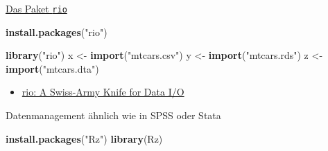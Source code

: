 \documentclass[
  ignorenonframetext,
]{beamer}
\newenvironment{Shaded}{\begin{snugshade}}{\end{snugshade}}
\newcommand{\KeywordTok}[1]{\textcolor[rgb]{0.26,0.66,0.93}{\textbf{#1}}}
\newcommand{\NormalTok}[1]{\textcolor[rgb]{0.74,0.68,0.62}{#1}}
\newcommand{\StringTok}[1]{\textcolor[rgb]{0.02,0.61,0.04}{#1}}
\providecommand{\tightlist}{%
  \setlength{\itemsep}{0pt}\setlength{\parskip}{0pt}}
\begin{document}
\begin{frame}[fragile]{\href{https://cran.r-project.org/web/packages/rio/vignettes/rio.html}{Das
Paket \texttt{rio}}}
\protect\hypertarget{das-paket-rio}{}

\begin{Shaded}
\begin{Highlighting}[]
\KeywordTok{install.packages}\NormalTok{(}\StringTok{"rio"}\NormalTok{)}
\end{Highlighting}
\end{Shaded}

\begin{Shaded}
\begin{Highlighting}[]
\KeywordTok{library}\NormalTok{(}\StringTok{"rio"}\NormalTok{)}
\NormalTok{x <-}\StringTok{ }\KeywordTok{import}\NormalTok{(}\StringTok{"mtcars.csv"}\NormalTok{)}
\NormalTok{y <-}\StringTok{ }\KeywordTok{import}\NormalTok{(}\StringTok{"mtcars.rds"}\NormalTok{)}
\NormalTok{z <-}\StringTok{ }\KeywordTok{import}\NormalTok{(}\StringTok{"mtcars.dta"}\NormalTok{)}
\end{Highlighting}
\end{Shaded}

\begin{itemize}
\tightlist
\item
  \href{https://cran.r-project.org/web/packages/rio/README.html}{rio: A
  Swiss-Army Knife for Data I/O}
\end{itemize}

\end{frame}

\begin{frame}[fragile]{Datenmanagement ähnlich wie in SPSS oder Stata}
\protect\hypertarget{datenmanagement-ahnlich-wie-in-spss-oder-stata}{}

\begin{Shaded}
\begin{Highlighting}[]
\KeywordTok{install.packages}\NormalTok{(}\StringTok{"Rz"}\NormalTok{)}
\KeywordTok{library}\NormalTok{(Rz)}
\end{Highlighting}
\end{Shaded}

\end{frame}
\end{document}
